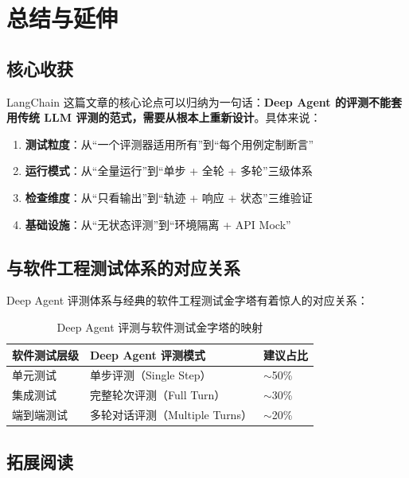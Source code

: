 \section{总结与延伸}

\subsection{核心收获}

LangChain 这篇文章的核心论点可以归纳为一句话：\textbf{Deep Agent 的评测不能套用传统 LLM 评测的范式，需要从根本上重新设计}。具体来说：

\begin{enumerate}
  \item \textbf{测试粒度}：从``一个评测器适用所有''到``每个用例定制断言''
  \item \textbf{运行模式}：从``全量运行''到``单步 + 全轮 + 多轮''三级体系
  \item \textbf{检查维度}：从``只看输出''到``轨迹 + 响应 + 状态''三维验证
  \item \textbf{基础设施}：从``无状态评测''到``环境隔离 + API Mock''
\end{enumerate}

\subsection{与软件工程测试体系的对应关系}

Deep Agent 评测体系与经典的软件工程测试金字塔有着惊人的对应关系：

\begin{table}[H]
\centering
\caption{Deep Agent 评测与软件测试金字塔的映射}
\begin{tabular}{lll}
\toprule
\textbf{软件测试层级} & \textbf{Deep Agent 评测模式} & \textbf{建议占比} \\
\midrule
单元测试 & 单步评测（Single Step） & $\sim$50\% \\
集成测试 & 完整轮次评测（Full Turn） & $\sim$30\% \\
端到端测试 & 多轮对话评测（Multiple Turns） & $\sim$20\% \\
\bottomrule
\end{tabular}
\end{table}

\subsection{拓展阅读}


